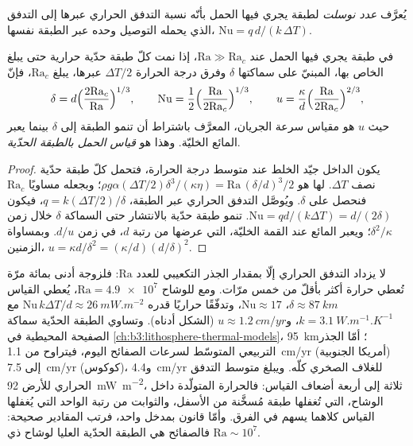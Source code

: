 \begin{definition}\label{def:b3:mantle-convection:nusselt}
يُعرَّف \emph{عدد نوسلت} لطبقة يجري فيها الحمل بأنّه
نسبة التدفق الحراري عبرها إلى التدفق الذي يحمله التوصيل وحده
عبر الطبقة نفسها، $\mathrm{Nu} = q\,d/(k\,\Delta T)$.
\end{definition}

\begin{theorem}\label{thm:b3:mantle-convection:scaling}
في طبقة يجري فيها الحمل عند $\mathrm{Ra} \gg \mathrm{Ra}_c$، إذا نمت كلّ طبقة حدّية حرارية
حتى يبلغ  الخاص بها، المبنيّ على سماكتها
$\delta$ وفرق درجة الحرارة $\Delta T/2$ عبرها، يبلغ
$\mathrm{Ra}_c$، فإنّ
\[
  \delta = d\Bigl(\frac{2\mathrm{Ra}_c}{\mathrm{Ra}}\Bigr)^{1/3},\qquad
  \mathrm{Nu} = \frac12\Bigl(\frac{\mathrm{Ra}}{2\mathrm{Ra}_c}\Bigr)^{1/3},
  \qquad
  u = \frac\kappa d\Bigl(\frac{\mathrm{Ra}}{2\mathrm{Ra}_c}\Bigr)^{2/3},
\]
حيث $u$ هو مقياس سرعة الجريان، المعرَّف باشتراط أن
تنمو الطبقة إلى $\delta$ بينما يعبر المائع الخليّة. وهذا هو
\emph{قياس الحمل بالطبقة الحدّية}.
\end{theorem}

\begin{proof}
يكون الداخل جيّد الخلط عند متوسط درجة الحرارة، فتحمل كلّ طبقة حدّية
نصف $\Delta T$.  لها هو $\rho g\alpha(\Delta T/2)
\delta^3/(\kappa\eta) = \mathrm{Ra}\,(\delta/d)^3/2$؛ وبجعله مساويًا
$\mathrm{Ra}_c$ فنحصل على $\delta$. ويُوصَّل التدفق الحراري عبر الطبقة،
$q = k(\Delta T/2)/\delta$، فيكون $\mathrm{Nu} = qd/(k\Delta T) = d/(2\delta)$.
تنمو طبقة حدّية بالانتشار حتى السماكة $\delta$ خلال زمن
$\delta^2/\kappa$؛ ويعبر المائع عند القمة الخليّة، التي عرضها من رتبة
$d$، في زمن $d/u$. وبمساواة الزمنين، $u = \kappa d/\delta^2 =
(\kappa/d)(d/\delta)^2$.
\end{proof}

لا يزداد التدفق الحراري إلّا بمقدار الجذر التكعيبي للعدد $\mathrm{Ra}$:
فلزوجة أدنى بمائة مرّة تُعطي حرارة أكثر بأقلّ من خمس مرّات.
ومع  للوشاح $\mathrm{Ra} = \num{4.9e7}$، يُعطي القياس $\delta \approx \qty{87}{km}$،
$\mathrm{Nu} \approx 17$، وتدفّقًا حراريًا قدره $\mathrm{Nu}\,k\Delta T/d \approx
\qty{26}{mW.m^{-2}}$ مع $k = \qty{3.1}{W.m^{-1}.K^{-1}}$، و$u \approx
\qty{1.2}{cm/yr}$ (الشكل أدناه). وتساوي الطبقة الحدّية سماكة الصفيحة المحيطية في
\cref{ch:b3:lithosphere-thermal-models}، \qty{95}{km}؛ أمّا
الجذر التربيعي المتوسّط لسرعات الصفائح اليوم، فيتراوح من \qty{1.1}{cm/yr} (أمريكا الجنوبية)
إلى \qty{7.5}{cm/yr} (كوكوس)، و\qty{4.4}{cm/yr} للغلاف
الصخري كلّه. ويبلغ متوسط التدفق الحراري للأرض \qty{92}{mW.m^{-2}}،
ثلاثة إلى أربعة أضعاف القياس: فالحرارة المتولّدة داخل الوشاح، التي تُغفلها طبقة
مُسخَّنة من الأسفل، والثوابت من رتبة الواحد التي يُغفلها القياس
كلاهما يسهم في الفرق. وأمّا قانون بمدخل واحد، فرتب المقادير
صحيحة: فالصفائح هي الطبقة الحدّية العليا لوشاح ذي $\mathrm{Ra}
\sim 10^7$.

